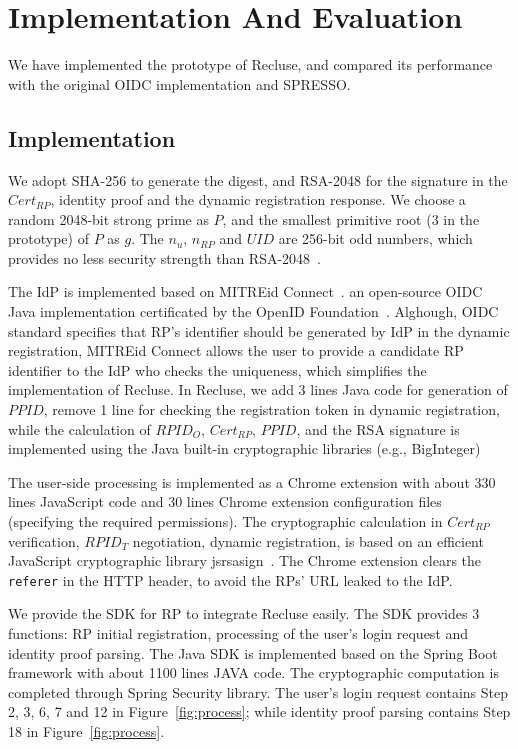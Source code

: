 \section{Implementation And Evaluation}
\label{sec:implementation}
We have implemented the prototype of Recluse, and compared its performance with the original OIDC implementation and SPRESSO.

\subsection{Implementation}  
We adopt SHA-256 to generate the digest, and  RSA-2048 for the signature in  the $Cert_{RP}$, identity proof and the dynamic registration response. We  choose a random 2048-bit strong prime as $P$, and the smallest primitive root (3 in the prototype)  of $P$ as $g$. The  $n_u$, $n_{RP}$ and $UID$  are 256-bit odd numbers, which provides no less security strength than RSA-2048~\cite{barkerecommendation}.

The IdP is implemented based on MITREid Connect~\cite{OIDF}. an open-source OIDC Java implementation certificated by the OpenID Foundation~\cite{OIDF}. Alghough, OIDC standard specifies that RP's identifier should be generated by IdP in the dynamic registration, MITREid Connect allows the user to provide a candidate RP identifier to the IdP who checks the uniqueness, which simplifies the implementation of Recluse. In Recluse, we add 3 lines Java code for generation of $PPID$, remove 1 line for checking the registration token in dynamic registration, while the calculation of $RPID_O$, $Cert_{RP}$,  $PPID$, and the RSA signature is implemented using the Java built-in cryptographic libraries (e.g., BigInteger)

The user-side processing is implemented as a Chrome extension with about 330 lines JavaScript code and 30 lines  Chrome extension configuration files (specifying the required permissions). The cryptographic calculation in $Cert_{RP}$ verification, $RPID_T$ negotiation, dynamic registration, is based on an efficient JavaScript cryptographic library  jsrsasign~\cite{jsrsasign}. The Chrome extension clears the \verb+referer+ in the HTTP header, to avoid the RPs' URL leaked to the IdP.


We provide the SDK for RP to integrate Recluse easily. The SDK provides 3 functions:  RP initial registration, processing of the user's login request and  identity proof parsing. The Java SDK is implemented based on the Spring Boot framework  with about 1100 lines JAVA code. The cryptographic computation is completed through Spring Security library. The user's login request contains Step 2, 3, 6, 7 and 12 in Figure~\ref{fig:process}; while  identity proof parsing contains Step 18 in Figure~\ref{fig:process}.


